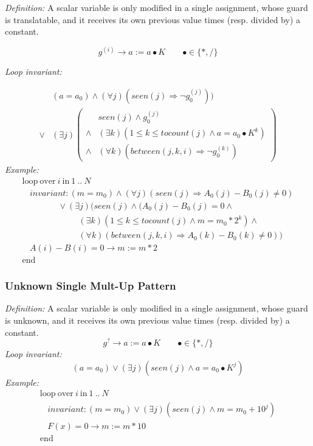 \documentclass[a4paper,10pt]{article}
\newcommand{\idx}{\ensuremath{i}\xspace}
\newcommand{\at}[1]{{(#1)}}
\newcommand{\KWloop}{\ensuremath{\mathrm{loop}~}}
\newcommand{\KWend}{\ensuremath{\mathrm{end}~}}
\newcommand{\KWover}{\ensuremath{\mathrm{over}~}}
\newcommand{\KWin}{\ensuremath{~\mathrm{in}~}}
\newcommand{\impl}{\ensuremath{\Longrightarrow}}
\newcommand{\seen}[1]{\ensuremath{\mathit{seen}(#1)}\xspace}
\newcommand{\tocount}[1]{\ensuremath{\mathit{tocount}(#1)}\xspace}
\newcommand{\between}[3]{\ensuremath{\mathit{between}{(#1,#2,#3)}}\xspace}
\newcommand{\loopinvariant}{\noindent\textit{Loop invariant:}\xspace}
\newcommand{\patterndef}{\noindent\textit{Definition:}\xspace}
\newcommand{\patternexample}{\noindent\textit{Example:}\xspace}
\begin{document}
\patterndef A scalar variable is only modified in a single assignment, whose
guard is translatable, and it receives its own previous value times
(resp. divided by) a constant.

$$g^\at{\idx} \rightarrow a := a \bullet K  \qquad \bullet \in \{*, / \}$$

\loopinvariant

\begin{eqnarray*}
&(a = a_0) \land (\forall j)(\seen{j} \impl \neg g_0^\at{j})) \\
\lor 
& (\exists j)
\left(\begin{array}{cl}
& \seen{j} \land g_0^\at{j} \\
\land& (\exists k)(1 \leq k \leq \tocount{j} \land a = a_0 \bullet K^k)\\
\land& (\forall k)(\between{j}{k}{\idx} \impl \neg g_0^\at{k})
\end{array}\right)
\end{eqnarray*}
%
\patternexample
$$\begin{array}{l}
  \KWloop \KWover i \KWin 1~..~N \\
  ~~~~ \textit{invariant}: (m = m_0) \land (\forall j)(\seen{j} \impl A_0(j)-B_0(j)\neq0)\\
  ~~~~~~~~~~~~~~~~~~~ \lor (\exists j)(\seen{j} \land (A_0(j)-B_0(j)= 0 \land \\
  ~~~~~~~~~~~~~~~~~~~~~~~~~~~~~~ (\exists k)(1 \leq k \leq \tocount{j} \land m = m_0 * 2^k) \land\\
  ~~~~~~~~~~~~~~~~~~~~~~~~~~~~~~ (\forall k)(\between{j}{k}{\idx} \impl A_0(k)-B_0(k)\neq0))\\
  ~~~~ A(i)-B(i)=0 \rightarrow m := m*2\\
  \KWend
\end{array}$$

\subsubsection*{Unknown Single Mult-Up Pattern}

\patterndef A scalar variable is only modified in a single assignment, whose
guard is unknown, and it receives its own previous value times
(resp. divided by) a constant.
%
$$g^? \rightarrow a := a \bullet K  \qquad \bullet \in \{*, / \}$$
%
\loopinvariant
%
$$(a = a_0) \lor (\exists j)(\seen{j} \land a = a_0 \bullet K^j)$$
%
\patternexample
$$\begin{array}{l}
  \KWloop \KWover i \KWin 1~..~N \\
  ~~~~ \textit{invariant}: (m = m_0) \lor (\exists j)(\seen{j} \land m = m_0+10^j)\\
  ~~~~ F(x)=0 \rightarrow m := m*10\\
  \KWend
\end{array}$$
\end{document}
